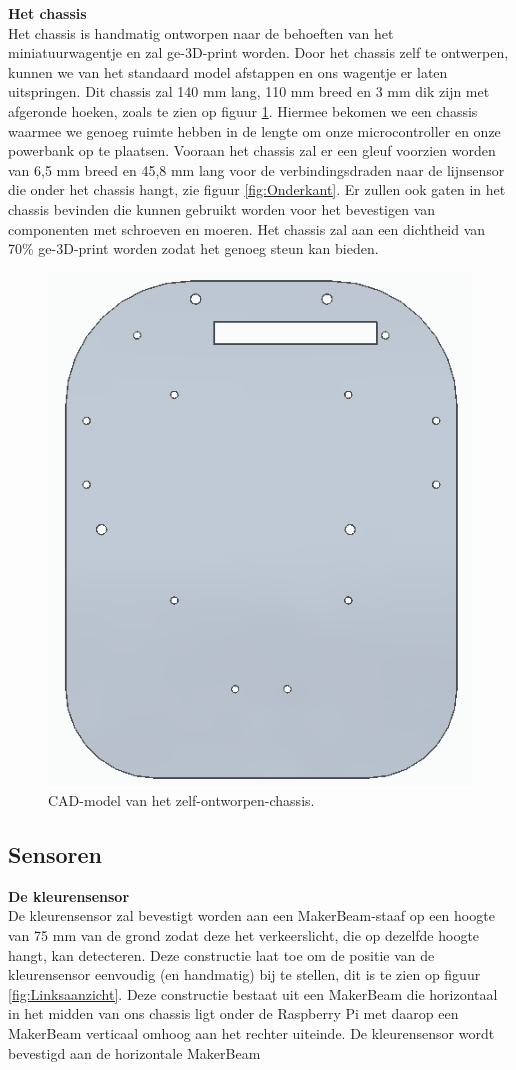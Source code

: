 \documentclass[a4paper,kulak]{kulakarticle}
\begin{document}
\textbf{\large Het chassis} \\
Het chassis is handmatig ontworpen naar de behoeften van het miniatuurwagentje en zal ge-3D-print worden. Door het chassis zelf te ontwerpen, kunnen we van het standaard model afstappen en ons wagentje er laten uitspringen. Dit chassis zal 140 mm lang, 110 mm breed en 3 mm dik zijn met afgeronde hoeken, zoals te zien op figuur \ref{fig:chassis}. Hiermee bekomen we een chassis waarmee we genoeg ruimte hebben in de lengte om onze microcontroller en onze powerbank op te plaatsen. Vooraan het chassis zal er een gleuf voorzien worden van 6,5 mm breed en 45,8 mm lang voor de verbindingsdraden naar de lijnsensor die onder het chassis hangt, zie figuur \ref{fig:Onderkant}. Er zullen ook gaten in het chassis bevinden die kunnen gebruikt worden voor het bevestigen van componenten met schroeven en moeren. Het chassis zal aan een dichtheid van 70\% ge-3D-print worden zodat het genoeg steun kan bieden.

\begin{figure}[h]
	\centering
	\includegraphics[width=.4\textwidth] {chascad}
	\caption{CAD-model van het zelf-ontworpen-chassis.}
	\label{fig:chassis}
\end{figure}

\subsection{Sensoren}
\textbf{\large De kleurensensor} \\
De kleurensensor zal bevestigt worden aan een MakerBeam-staaf op een hoogte van 75 mm van de grond zodat deze het verkeerslicht, die op dezelfde hoogte hangt, kan detecteren. Deze constructie laat toe om de positie van de kleurensensor eenvoudig (en handmatig) bij te stellen, dit is te zien op figuur \ref{fig:Linksaanzicht}. Deze constructie bestaat uit een MakerBeam die horizontaal in het midden van ons chassis ligt onder de Raspberry Pi met daarop een MakerBeam verticaal omhoog aan het rechter uiteinde. De kleurensensor wordt bevestigd aan de horizontale MakerBeam
\end{document}
